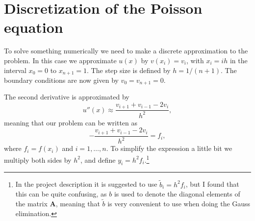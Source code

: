\documentclass[12pt, a4paper]{article}
\begin{document}
\section{Discretization of the Poisson equation}

To solve something numerically we need to make a discrete approximation to the problem. In this case 
we approximate $u(x)$ by $v(x_i)=v_i$, with $x_i=ih$ in the interval $x_0=0$ to $x_{n+1}=1$. The step 
size is defined by $h=1/(n+1)$. The boundary conditions are now given by $v_0 = v_{n+1} = 0$.   

The second derivative is approximated by 
\begin{equation}
u''(x) \approx \frac{v_{i+1} + v_{i-1} - 2v_i}{h^2}, 
\end{equation}
meaning that our problem can be written as 
\begin{equation}
-\frac{v_{i+1} + v_{i-1} - 2v_i}{h^2} = f_i, 
\label{poisson_disc}
\end{equation}
where $f_i = f(x_i)$ and $i=1,\dots,n$. To simplify the expression a little bit we multiply both sides by 
$h^2$, and define $y_i = h^2 f_i$.\footnote{In the project description it is suggested to use 
$\tilde{b}_i = h^2 f_i$, but I found that this can be quite confusing, as $b$ is used to denote 
the diagonal elements of the matrix $\mathbf{A}$, meaning that $\tilde{b}$ is very convenient to use when 
doing the Gauss elimination.}  
\end{document}
